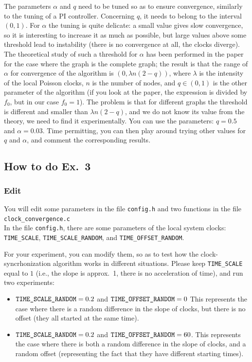 \documentclass[oneside]{article}
\begin{document}
The parameters $\alpha$ and $q$ need to be tuned so as to ensure convergence, similarly to the tuning of a PI controller.
Concerning $q$, it needs to belong to the interval $(0,1)$. For $\alpha$ the tuning is quite delicate: a small value gives slow convergence, so it is interesting to increase it as much as possible, but large values above some threshold lead to instability (there is no convergence at all, the clocks diverge). The theoretical study of such a threshold for $\alpha$ has been performed in the paper \cite{RandSync-journal} for the case where the graph is the complete graph; the result is that the range of $\alpha$ for convergence of the algorithm is $(0, \lambda n (2-q))$, where $\lambda$ is the intensity of the local Poisson clocks, $n$ is the number of nodes, and $q \in (0,1) $ is the other parameter of the algorithm (if you look at the paper, the expression is divided by $f_0$, but in our case $f_0=1$). The problem is that for different graphs the threshold is different and smaller than $\lambda n (2-q)$, and we do not know its value from the theory, we need to find it experimentally. You can use the parameters: $q=0.5$ and $\alpha = 0.03$. Time permitting, you can then play around trying other values for $q$ and $\alpha$, and comment the corresponding results.




\subsection{How to do Ex.~3}

\subsubsection{Edit}
You will edit some parameters in the file \verb=config.h= and two functions in the file \verb=clock_convergence.c=\\


In the file \verb=config.h=, there are some parameters of the local system clocks:
\verb=TIME_SCALE=, \verb=TIME_SCALE_RANDOM=, and \verb=TIME_OFFSET_RANDOM=.

For your experiment, you can modify them, so as to test how the clock-syncrhonization algorithm works in different situations. 
Please keep \verb=TIME_SCALE= equal to $1$ (i.e., the slope is approx.~1, there is no acceleration of time), and run two experiments:
\begin{itemize}
\item
$\verb=TIME_SCALE_RANDOM= =0.2 $ and $ \verb=TIME_OFFSET_RANDOM= = 0$
This represents the case where there is a random difference in the slope of clocks, but there is no offset (they all started at the same time).
\item
$\verb=TIME_SCALE_RANDOM= =0.2 $ and $ \verb=TIME_OFFSET_RANDOM= = 60$.
This represents the case where there is both a random difference in the slope of clocks, and a random offset (representing the fact that they have different starting times).
\end{itemize}
\end{document}
